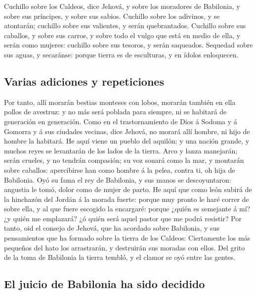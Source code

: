  Cuchillo sobre los Caldeos, dice Jehová, y sobre los
moradores de Babilonia, y sobre sus príncipes, y sobre sus sabios.
 Cuchillo sobre los adivinos, y se atontarán; cuchillo
sobre sus valientes, y serán quebrantados.  Cuchillo sobre
sus caballos, y sobre sus carros, y sobre todo el vulgo que está en
medio de ella, y serán como mujeres: cuchillo sobre sus tesoros, y serán
saqueados.  Sequedad sobre sus aguas, y secaránse: porque
tierra es de esculturas, y en ídolos enloquecen.

\hypertarget{varias-adiciones-y-repeticiones}{%
\subsection{Varias adiciones y
repeticiones}\label{varias-adiciones-y-repeticiones}}

 Por tanto, allí morarán bestias monteses con lobos,
morarán también en ella pollos de avestruz: y no más será poblada para
siempre, ni se habitará de generación en generación.  Como
en el trastornamiento de Dios á Sodoma y á Gomorra y á sus ciudades
vecinas, dice Jehová, no morará allí hombre, ni hijo de hombre la
habitará.  He aquí viene un pueblo del aquilón; y una
nación grande, y muchos reyes se levantarán de los lados de la tierra.
 Arco y lanza manejarán; serán crueles, y no tendrán
compasión; su voz sonará como la mar, y montarán sobre caballos:
apercibirse han como hombre á la pelea, contra ti, oh hija de Babilonia.
 Oyó su fama el rey de Babilonia, y sus manos se
descoyuntaron: angustia le tomó, dolor como de mujer de parto.
 He aquí que como león subirá de la hinchazón del Jordán á
la morada fuerte: porque muy pronto le haré correr de sobre ella, y al
que fuere escogido la encargaré: porque ¿quién es semejante á mí? ¿y
quién me emplazará? ¿ó quién será aquel pastor que me podrá resistir?
 Por tanto, oid el consejo de Jehová, que ha acordado sobre
Babilonia, y sus pensamientos que ha formado sobre la tierra de los
Caldeos: Ciertamente los más pequeños del hato los arrastrarán, y
destruirán sus moradas con ellos.  Del grito de la toma de
Babilonia la tierra tembló, y el clamor se oyó entre las gentes.

\hypertarget{el-juicio-de-babilonia-ha-sido-decidido}{%
\subsection{El juicio de Babilonia ha sido
decidido}\label{el-juicio-de-babilonia-ha-sido-decidido}}

